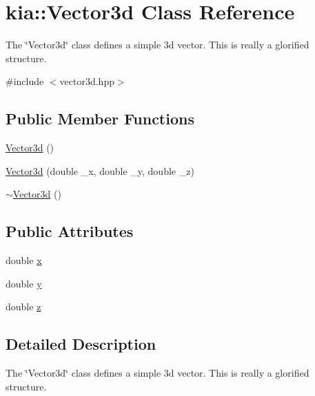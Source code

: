 \hypertarget{classkia_1_1Vector3d}{\section{kia\-:\-:Vector3d Class Reference}
\label{classkia_1_1Vector3d}
}


The \char`\"{}\-Vector3d\char`\"{} class defines a simple 3d vector. This is really a glorified structure.  




{\ttfamily \#include $<$vector3d.\-hpp$>$}

\subsection*{Public Member Functions}
\begin{DoxyCompactItemize}
\item 
\hyperlink{classkia_1_1Vector3d_adb280966035d66dc4e965c57fc727001}{Vector3d} ()
\item 
\hyperlink{classkia_1_1Vector3d_afe662bc4ba64ae304c1d2ac7a56f02c7}{Vector3d} (double \-\_\-x, double \-\_\-y, double \-\_\-z)
\item 
\hyperlink{classkia_1_1Vector3d_a0eb53928a4976d413252840386b6d7ab}{$\sim$\-Vector3d} ()
\end{DoxyCompactItemize}
\subsection*{Public Attributes}
\begin{DoxyCompactItemize}
\item 
double \hyperlink{classkia_1_1Vector3d_a6fde3f43e58f79e4a505bd100155ea17}{x}
\item 
double \hyperlink{classkia_1_1Vector3d_ae2c31b91dd82f1ced679d47ff69a0af5}{y}
\item 
double \hyperlink{classkia_1_1Vector3d_af227022a04148d9f14c8bbb6bb3c6c2c}{z}
\end{DoxyCompactItemize}


\subsection{Detailed Description}
The \char`\"{}\-Vector3d\char`\"{} class defines a simple 3d vector. This is really a glorified structure. 

